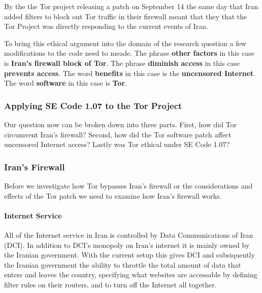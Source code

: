 \documentclass[11pt]{article}
\begin{document}
\begin{multicols}{2}
\newline

By the the Tor project releasing a patch on September 14 the same day that Iran
added filters to block out Tor traffic in their firewall meant that they
that the Tor Project was directly responding to the current events of Iran.

To bring this ethical argument into the domain of the research question a few
modifications to the code need to meade. The phrase \textbf{other factors} in
this case is \textbf{Iran's firewall block of Tor}. The phrase \textbf{diminish
access} in this case \textbf{prevents access}. The word \textbf{benefits} in
this case is the \textbf{uncensored Internet}. The word \textbf{software} in this
case is \textbf{Tor}.

\subsubsection{Applying SE Code 1.07 to the Tor Project}

\newline

Our question now can be broken down into three parts. First, how did Tor
circumvent Iran's firewall? Second, how did the Tor software patch affect
uncensored Internet access?  Lastly was Tor ethical under SE Code 1.07?

\subsubsection{Iran's Firewall}
Before we investigate how Tor bypasses Iran's firewall or the considerations and
effects of the Tor patch we need to examine how Iran's firewall works.

\paragraph{Internet Service}

All of the Internet service in Iran is controlled by Data Communications of Iran
(DCI).\cite{FindingWayAroundIranianCensorship} In addition to DCI's monopoly on
Iran's internet it is mainly owned by the Iranian
government.\cite{FindingWayAroundIranianCensorship, DCI:Articles} With the
current setup this gives DCI and subsiquently the Iranian government the ability
to throttle the total amount of data that enters and leaves the country,
specifying what websites are accessable by defining filter rules on their
routers, and to turn off the Internet all
together.\cite{FindingWayAroundIranianCensorship}


\end{multicols}
\end{document}
